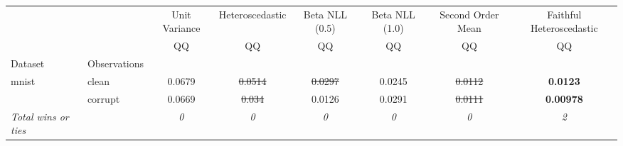 \begin{tabular}{ll|c|c|c|c|c|c}
\toprule
{} & {} & {Unit Variance} & {Heteroscedastic} & {Beta NLL (0.5)} & {Beta NLL (1.0)} & {Second Order Mean} & {Faithful Heteroscedastic} \\
{} & {} & {QQ} & {QQ} & {QQ} & {QQ} & {QQ} & {QQ} \\
{Dataset} & {Observations} & {} & {} & {} & {} & {} & {} \\
\midrule
\multirow[t]{2}{*}{mnist} & clean & 0.0679 & \sout{0.0514} & \sout{0.0297} & 0.0245 & \sout{0.0112} & \textbf{0.0123} \\
 & corrupt & 0.0669 & \sout{0.034} & 0.0126 & 0.0291 & \sout{0.0111} & \textbf{0.00978} \\
\textit{{Total wins or ties}} &  & \textit{0} & \textit{0} & \textit{0} & \textit{0} & \textit{0} & \textit{2} \\
\bottomrule
\end{tabular}
